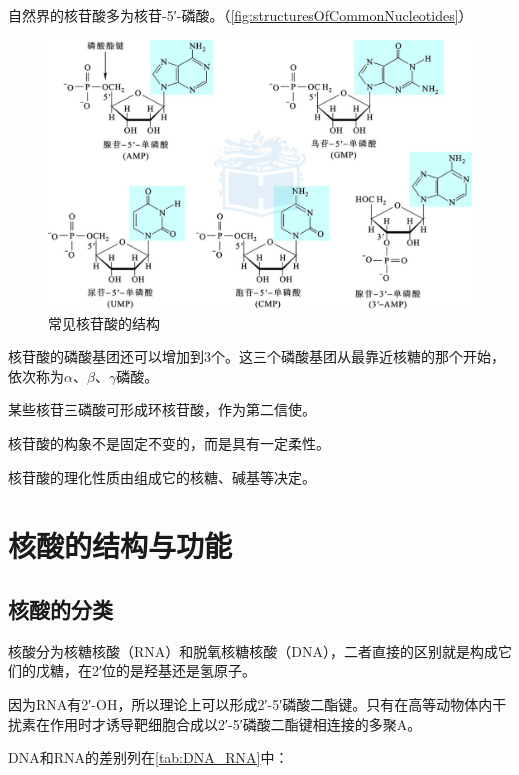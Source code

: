 自然界的核苷酸多为核苷-5′-磷酸。（\autoref{fig:structuresOfCommonNucleotides}）

\begin{figure}[htbp]
	\centering
	\includegraphics[width=0.9\linewidth]{Pics/常见核苷酸的结构}
	\caption{常见核苷酸的结构}
	\label{fig:structuresOfCommonNucleotides}
\end{figure}

核苷酸的磷酸基团还可以增加到3个。这三个磷酸基团从最靠近核糖的那个开始，依次称为$\alpha$、$\beta$、$\gamma$磷酸。

某些核苷三磷酸可形成环核苷酸，作为第二信使。

核苷酸的构象不是固定不变的，而是具有一定柔性。

核苷酸的理化性质由组成它的核糖、碱基等决定。

\section{核酸的结构与功能}

\subsection{核酸的分类}

核酸分为核糖核酸（RNA）和脱氧核糖核酸（DNA），二者直接的区别就是构成它们的戊糖，在2′位的是羟基还是氢原子。

因为RNA有2′-OH，所以理论上可以形成2′-5′磷酸二酯键。只有在高等动物体内干扰素在作用时才诱导靶细胞合成以2′-5′磷酸二酯键相连接的多聚A。

DNA和RNA的差别列在\autoref{tab:DNA_RNA}中：

